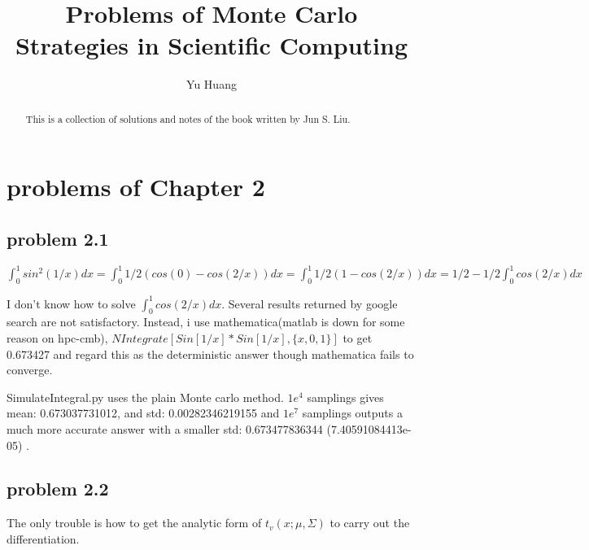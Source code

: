 \documentclass[a4paper,10pt]{article}
\title{Problems of Monte Carlo Strategies in Scientific Computing}
\author{Yu Huang}
\begin{document}
\maketitle

\begin{abstract}
This is a collection of solutions and notes of the book written by Jun S. Liu.
\end{abstract}
\tableofcontents

\section{problems of Chapter 2}
\subsection{problem 2.1}

\begin{math}
\int_{0}^{1} sin^2(1/x)dx = \int_{0}^{1}1/2(cos(0)-cos(2/x))dx = \int_{0}^{1}1/2(1-cos(2/x))dx = 1/2 - 1/2\int_{0}^{1}cos(2/x)dx
\end{math}

I don't know how to solve $\int_{0}^{1}cos(2/x)dx$. Several results returned by google search are not satisfactory. Instead, i use mathematica(matlab is down for some reason on hpc-cmb), $NIntegrate[Sin[1/x]*Sin[1/x], \{x, 0, 1\}]$ to get 0.673427 and regard this as the deterministic answer though mathematica fails to converge.

SimulateIntegral.py uses the plain Monte carlo method. $1e^4$ samplings gives mean: 0.673037731012, and std: 0.00282346219155 and $1e^7$ samplings outputs a much more accurate answer with a smaller std: 0.673477836344 (7.40591084413e-05) .

\subsection{problem 2.2}
The only trouble is how to get the analytic form of $t_v(x; \mu, \Sigma)$ to carry out the differentiation.
\end{document}
